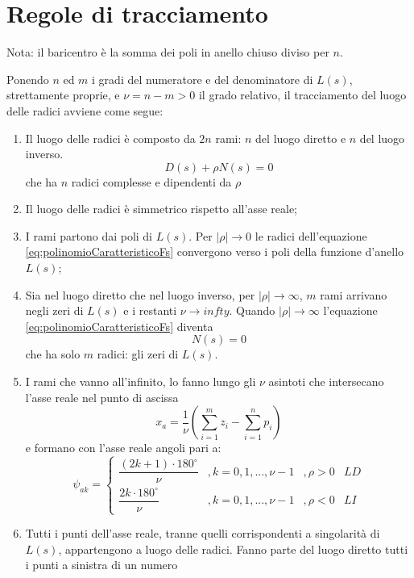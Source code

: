 \documentclass[a4paper]{report}
\begin{document}
\section{Regole di tracciamento}
Nota: il baricentro \`e la somma dei poli in anello
chiuso diviso per $n$.

Ponendo $n$ ed $m$ i gradi del numeratore e del denominatore di
$L(s)$, strettamente proprie, e $\nu = n - m > 0$ il grado relativo,
il tracciamento del luogo delle radici avviene come segue:
\begin{enumerate}
\item Il luogo delle radici \`e composto da $2n$ rami: $n$ del luogo
  diretto e $n$ del luogo inverso.
  \begin{equation}\label{eq:polinomioCaratteristicoFs}
    D(s) + \rho N(s) = 0
  \end{equation}
  che ha $n$ radici complesse e dipendenti da $\rho$
\item Il luogo delle radici \`e simmetrico rispetto all'asse reale;
\item I rami partono dai poli di $L(s)$. Per $|\rho| \to 0$ le radici
  dell'equazione \ref{eq:polinomioCaratteristicoFs} convergono verso i
  poli della funzione d'anello $L(s)$;
\item Sia nel luogo diretto che nel luogo inverso, per $|\rho| \to
  \infty$, $m$ rami arrivano negli zeri di $L(s)$ e i restanti $\nu
  \to infty$. Quando $|\rho| \to \infty$ l'equazione
  \ref{eq:polinomioCaratteristicoFs} diventa
  \[
  N(s) = 0
  \]
  che ha solo $m$ radici: gli zeri di $L(s)$.
\item I rami che vanno all'infinito, lo fanno lungo gli $\nu$ asintoti
  che intersecano l'asse reale nel punto di ascissa
  \begin{equation}\label{eq:xa}
    x_a = \dfrac{1}{\nu} \left( \sum_{i = 1}^{m} z_i - \sum_{i =
      1}^{n} p_i  \right) 
  \end{equation}
  e formano con l'asse reale angoli pari a:
  \[
  \psi_{ak} =
  \left \{
  \begin{array}{llll}
    \dfrac{(2k + 1) \cdot 180^{\circ}}{\nu} &, k=0,1,...,\nu - 1 &,
    \rho > 0 & LD\\
    \dfrac{2k \cdot 180^{\circ}}{\nu} &, k=0,1,...,\nu - 1 &,
    \rho < 0 & LI
  \end{array}
  \right .
  \]
\item Tutti i punti dell'asse reale, tranne quelli corrispondenti a
  singolarit\`a di $L(s)$, appartengono a luogo delle radici. Fanno
  parte del luogo diretto tutti i punti a sinistra di un numero

\end{enumerate}
\end{document}
